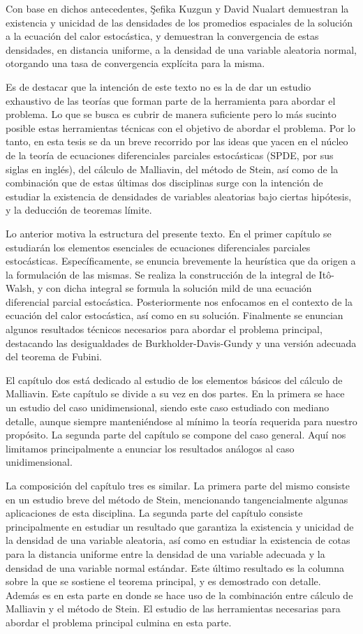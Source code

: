 \documentclass[letterpaper,twoside,12pt]{book}
\newcommand{\1}{\mathds{1}}
\theoremstyle{definition}
\theoremstyle{definition}
\theoremstyle{remark}
\theoremstyle{definition}
\theoremstyle{definition}
\theoremstyle{definition}
\theoremstyle{definition}
\theoremstyle{definition}
\begin{document}
Con base en dichos antecedentes, \c{S}efika Kuzgun y David Nualart demuestran la existencia y unicidad de las densidades de los promedios espaciales de la solución a la ecuación del calor estocástica, y demuestran la convergencia de estas densidades, en distancia uniforme, a la densidad de una variable aleatoria normal, otorgando una tasa de convergencia explícita para la misma.

Es de destacar que la intención de este texto no es la de dar un estudio exhaustivo de las teorías que forman parte de la herramienta para abordar el problema. Lo que se busca es cubrir de manera suficiente pero lo más sucinto posible estas herramientas técnicas con el objetivo de abordar el problema. Por lo tanto, en esta tesis se da un breve recorrido por las ideas que yacen en el núcleo de la teoría de ecuaciones diferenciales parciales estocásticas (SPDE, por sus siglas en inglés), del cálculo de Malliavin, del método de Stein, así como de la combinación que de estas últimas dos disciplinas surge con la intención de estudiar la existencia de densidades de variables aleatorias bajo ciertas hipótesis, y la deducción de teoremas límite. 

Lo anterior motiva la estructura del presente texto. En el primer capítulo se estudiarán los elementos esenciales de ecuaciones diferenciales parciales estocásticas. Específicamente, se enuncia brevemente la heurística que da origen a la formulación de las mismas. Se realiza la construcción de la integral de Itô-Walsh, y con dicha integral se formula la solución mild de una ecuación diferencial parcial estocástica. Posteriormente nos enfocamos en el contexto de la ecuación del calor estocástica, así como en su solución. Finalmente se enuncian algunos resultados técnicos necesarios para abordar el problema principal, destacando las desigualdades de Burkholder-Davis-Gundy y una versión adecuada del teorema de Fubini.

El capítulo dos está dedicado al estudio de los elementos básicos del cálculo de Malliavin. Este capítulo se divide a su vez en dos partes. En la primera se hace un estudio del caso unidimensional, siendo este caso estudiado con mediano detalle, aunque siempre manteniéndose al mínimo la teoría requerida para nuestro propósito. La segunda parte del capítulo se compone del caso general. Aquí nos limitamos principalmente a enunciar los resultados análogos al caso unidimensional. 

La composición del capítulo tres es similar. La primera parte del mismo consiste en un estudio breve del método de Stein, mencionando tangencialmente algunas aplicaciones de esta disciplina. La segunda parte del capítulo consiste principalmente en estudiar un resultado que garantiza la existencia y unicidad de la densidad de una variable aleatoria, así como en estudiar la existencia de cotas para la distancia uniforme entre la densidad de una variable adecuada y la densidad de una variable normal estándar. Este último resultado es la columna sobre la que se sostiene el teorema principal, y es demostrado con detalle. Además es en esta parte en donde se hace uso de la combinación entre cálculo de Malliavin y el método de Stein. El estudio de las herramientas necesarias para abordar el problema principal culmina en esta parte.
\end{document}
